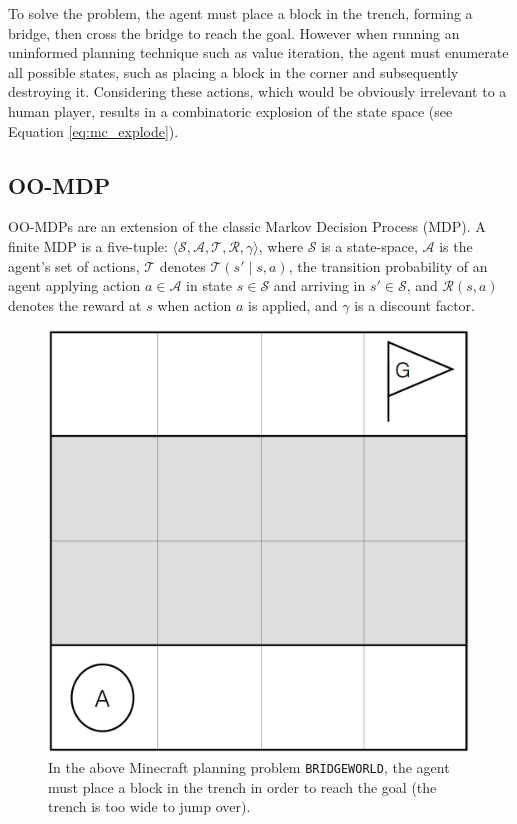 \documentclass[]{article}
\begin{document}
To solve the problem, the agent must
place a block in the trench, forming a bridge, then cross the bridge
to reach the goal.  However when running an uninformed planning
technique such as value iteration, the agent must enumerate all
possible states, such as placing a block in the corner and
subsequently destroying it.  Considering these actions, which would be
obviously irrelevant to a human player, results in a combinatoric
explosion of the state space (see Equation \ref{eq:mc_explode}).

\subsection{OO-MDP}

OO-MDPs are an extension of the classic Markov Decision Process (MDP).
A finite MDP is a five-tuple: $\langle \mathcal{S}, \mathcal{A},
\mathcal{T}, \mathcal{R}, \gamma \rangle$, where $\mathcal{S}$ is a
state-space, $\mathcal{A}$ is the agent's set of actions,
$\mathcal{T}$ denotes $\mathcal{T}(s' \mid s,a)$, the transition
probability of an agent applying action $a \in \mathcal{A}$ in state
$s \in \mathcal{S}$ and arriving in $s' \in \mathcal{S}$, and
$\mathcal{R}(s,a)$ denotes the reward at $s$ when action $a$ is
applied, and $\gamma$ is a discount factor.

\begin{figure}
\centering
\includegraphics[scale=0.2]{figures/bridgeworld.png}
\caption{In the above Minecraft planning problem \texttt{BRIDGEWORLD},
the agent must place a block in the trench in order to reach the goal 
(the trench is too wide to jump over). \label{fig:bridgeworld}}
\end{figure}
\end{document}
